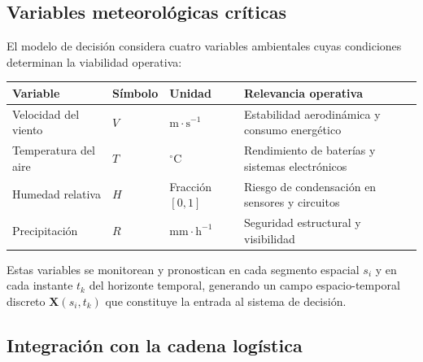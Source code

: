 \documentclass[
  spanish,
  us-letterpaper,
]{scrreprt}
\numberwithin{equation}{section}
\begin{document}
\subsection{Variables meteorológicas
críticas}\label{variables-meteoroluxf3gicas-cruxedticas}

El modelo de decisión considera cuatro variables ambientales cuyas
condiciones determinan la viabilidad operativa:

\begin{longtable}[]{@{}
  >{\raggedright\arraybackslash}p{}
  >{\raggedright\arraybackslash}p{}
  >{\raggedright\arraybackslash}p{}
  >{\raggedright\arraybackslash}p{}@{}}
\toprule\noalign{}
\begin{minipage}[b]{\linewidth}\raggedright
Variable
\end{minipage} & \begin{minipage}[b]{\linewidth}\raggedright
Símbolo
\end{minipage} & \begin{minipage}[b]{\linewidth}\raggedright
Unidad
\end{minipage} & \begin{minipage}[b]{\linewidth}\raggedright
Relevancia operativa
\end{minipage} \\
\midrule\noalign{}
\endhead
\bottomrule\noalign{}
\endlastfoot
Velocidad del viento & \(V\) & \(\mathrm{m \cdot s^{-1}}\) & Estabilidad
aerodinámica y consumo energético \\
Temperatura del aire & \(T\) & \(^\circ\mathrm{C}\) & Rendimiento de
baterías y sistemas electrónicos \\
Humedad relativa & \(H\) & Fracción \([0,1]\) & Riesgo de condensación
en sensores y circuitos \\
Precipitación & \(R\) & \(\mathrm{mm \cdot h^{-1}}\) & Seguridad
estructural y visibilidad \\
\end{longtable}

Estas variables se monitorean y pronostican en cada segmento espacial
\(s_i\) y en cada instante \(t_k\) del horizonte temporal, generando un
campo espacio-temporal discreto \(\mathbf{X}(s_i, t_k)\) que constituye
la entrada al sistema de decisión.

\subsection{Integración con la cadena
logística}\label{integraciuxf3n-con-la-cadena-loguxedstica}
\end{document}
